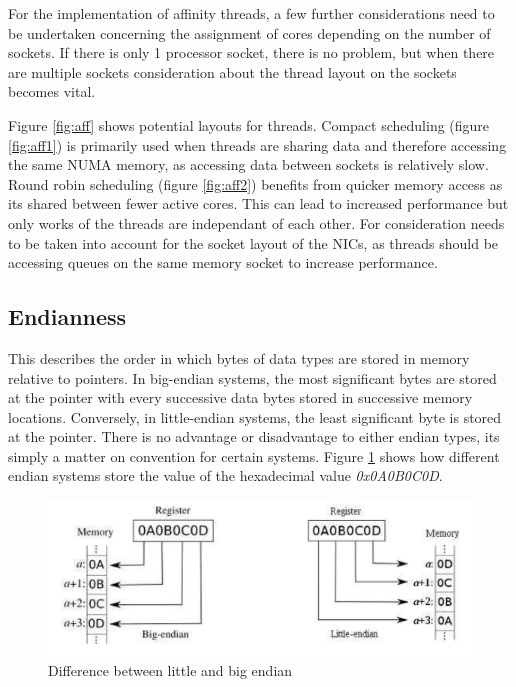 \documentclass[final_report.tex]{subfiles}
\begin{document}
For the implementation of affinity threads, a few further considerations need to be undertaken concerning the assignment of cores depending on the number of sockets. If there is only 1 processor socket, there is no problem, but when there are multiple sockets consideration about the thread layout on the sockets becomes vital.

Figure \ref{fig:aff} shows potential layouts for threads. Compact scheduling (figure \ref{fig:aff1}) is primarily used when threads are sharing data and therefore accessing the same NUMA memory, as accessing data between sockets is relatively slow. Round robin scheduling (figure \ref{fig:aff2}) benefits from quicker memory access as its shared between fewer active cores. This can lead to increased performance but only works of the threads are independant of each other. For consideration needs to be taken into account for the socket layout of the NICs, as threads should be accessing queues on the same memory socket to increase performance.

\subsection{Endianness}
This describes the order in which bytes of data types are stored in memory relative to pointers. In big-endian systems, the most significant bytes are stored at the pointer with every successive data bytes stored in successive memory locations. Conversely, in little-endian systems, the least significant byte is stored at the pointer. There is no advantage or disadvantage to either endian types, its simply a matter on convention for certain systems. Figure \ref{fig:endian} shows how different endian systems store the value of the hexadecimal value \textit{0x0A0B0C0D}. 

\begin{figure}[H]
	\centering
	\includegraphics[width=\textwidth]{img/endian.png}
	\caption{Difference between little and big endian}
	\label{fig:endian}
\end{figure}
\end{document}

